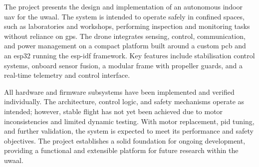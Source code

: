 The project presents the design and implementation of an autonomous indoor \gls{uav} for the \gls{uwaal}. The system is intended to operate safely in confined spaces, such as laboratories and workshops, performing inspection and monitoring tasks without reliance on \gls{gps}. The drone integrates sensing, control, communication, and power management on a compact platform built around a custom \gls{pcb} and an \gls{esp32} running the \gls{esp-idf} framework. Key features include stabilisation control systems, onboard sensor fusion, a modular frame with propeller guards, and a real-time telemetry and control interface.

All hardware and firmware subsystems have been implemented and verified individually. The architecture, control logic, and safety mechanisms operate as intended; however, stable flight has not yet been achieved due to motor inconsistencies and limited dynamic testing. With motor replacement, \gls{pid} tuning, and further validation, the system is expected to meet its performance and safety objectives. The project establishes a solid foundation for ongoing development, providing a functional and extensible platform for future research within the \gls{uwaal}.